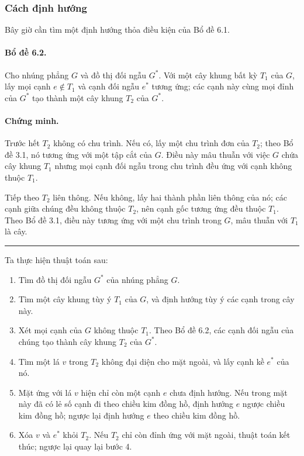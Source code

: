 \documentclass[11pt]{article}
\begin{document}
\subsubsection{Cách định hướng}

Bây giờ cần tìm một định hướng thỏa điều kiện của Bổ đề 6.1.

\paragraph{Bổ đề 6.2.}
Cho nhúng phẳng $G$ và đồ thị đối ngẫu $G^*$. Với một cây khung bất kỳ $T_1$ của
$G$, lấy mọi cạnh $e\notin T_1$ và cạnh đối ngẫu $e^*$ tương ứng; các cạnh này
cùng mọi đỉnh của $G^*$ tạo thành một cây khung $T_2$ của $G^*$.

\paragraph{Chứng minh.}
Trước hết $T_2$ không có chu trình. Nếu có, lấy một chu trình đơn của $T_2$;
theo Bổ đề 3.1, nó tương ứng với một tập cắt của $G$. Điều này mâu thuẫn với
việc $G$ chứa cây khung $T_1$ nhưng mọi cạnh đối ngẫu trong chu trình đều ứng
với cạnh không thuộc $T_1$.

Tiếp theo $T_2$ liên thông. Nếu không, lấy hai thành phần liên thông của nó; các
cạnh giữa chúng đều không thuộc $T_2$, nên cạnh gốc tương ứng đều thuộc $T_1$.
Theo Bổ đề 3.1, điều này tương ứng với một chu trình trong $G$, mâu thuẫn với
$T_1$ là cây.
\hfill\rule{0.55em}{0.55em}

Ta thực hiện thuật toán sau:
\begin{enumerate}
  \item Tìm đồ thị đối ngẫu $G^*$ của nhúng phẳng $G$.
  \item Tìm một cây khung tùy ý $T_1$ của $G$, và định hướng tùy ý các cạnh
  trong cây này.
  \item Xét mọi cạnh của $G$ không thuộc $T_1$. Theo Bổ đề 6.2, các cạnh đối
  ngẫu của chúng tạo thành cây khung $T_2$ của $G^*$.
  \item Tìm một lá $v$ trong $T_2$ không đại diện cho mặt ngoài, và lấy cạnh
  kề $e^*$ của nó.
  \item Mặt ứng với lá $v$ hiện chỉ còn một cạnh $e$ chưa định hướng. Nếu trong
  mặt này đã có lẻ số cạnh đi theo chiều kim đồng hồ, định hướng $e$ ngược
  chiều kim đồng hồ; ngược lại định hướng $e$ theo chiều kim đồng hồ.
  \item Xóa $v$ và $e^*$ khỏi $T_2$. Nếu $T_2$ chỉ còn đỉnh ứng với mặt ngoài,
  thuật toán kết thúc; ngược lại quay lại bước 4.
\end{enumerate}
\end{document}
